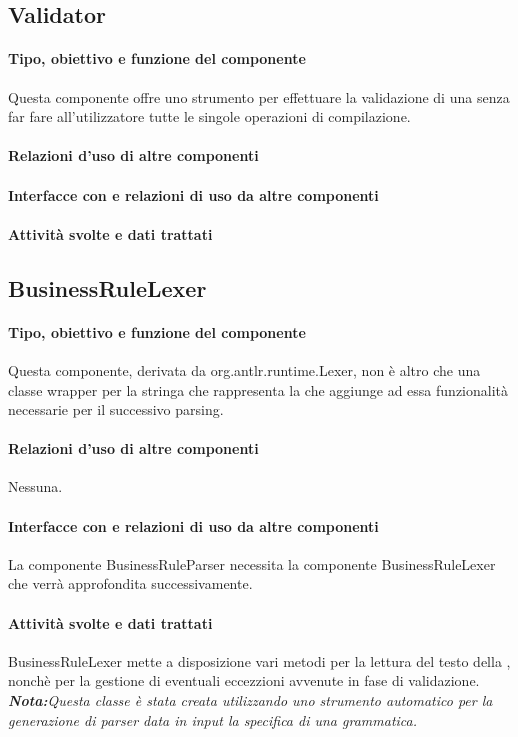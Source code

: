 \documentclass[11pt,titlepage,a4paper]{report}
\begin{document}
\subsection{Validator}%
\paragraph{Tipo, obiettivo e funzione del componente}
Questa componente offre uno strumento per effettuare la validazione di una \br senza far fare all'utilizzatore tutte le singole operazioni di compilazione.
\paragraph{Relazioni d'uso di altre componenti}

\paragraph{Interfacce con e relazioni di uso da altre componenti}
\paragraph{Attivit\`a svolte e dati trattati}

\subsection{BusinessRuleLexer}
\paragraph{Tipo, obiettivo e funzione del componente}
Questa componente, derivata da org.antlr.runtime.Lexer, non \`e altro che una classe wrapper per la stringa che rappresenta la \br che aggiunge ad essa funzionalit\`a necessarie per il successivo parsing.
\paragraph{Relazioni d'uso di altre componenti}
Nessuna.
\paragraph{Interfacce con e relazioni di uso da altre componenti}
La componente BusinessRuleParser necessita la componente BusinessRuleLexer che verr\`a approfondita successivamente.
\paragraph{Attivit\`a svolte e dati trattati}
BusinessRuleLexer mette a disposizione vari metodi per la lettura del testo della \br, nonch\`e per la gestione di eventuali eccezzioni avvenute in fase di validazione.
\textit{\textbf{Nota:}Questa classe \`e stata creata utilizzando uno strumento automatico per la generazione di parser data in input la specifica di una grammatica.}
\end{document}
